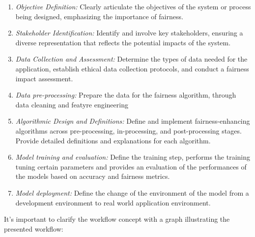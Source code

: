 \documentclass[12pt,a4paper,openright,twoside]{book}
\begin{document}
\begin{enumerate}

    \item \emph{Objective Definition:} Clearly articulate the objectives of the system or process being designed, emphasizing the importance of fairness.

    \item \emph{Stakeholder Identification:} Identify and involve key stakeholders, ensuring a diverse representation that reflects the potential impacts of the system.

    \item \emph{Data Collection and Assessment:} Determine the types of data needed for the application, establish ethical data collection protocols, and conduct a fairness impact assessment.

    \item \emph{Data pre-processing:} Prepare the data for the fairness algorithm, through data cleaning and featyre engineering
    
    \item \emph{Algorithmic Design and Definitions:} Define and implement fairness-enhancing algorithms across pre-processing, in-processing, and post-processing stages. Provide detailed definitions and explanations for each algorithm.

    \item \emph{Model training and evaluation:} Define the training step, performs the training tuning certain parameters and provides an evaluation of the performances of the models based on accuracy and fairness metrics.

    \item \emph{Model deployment:} Define the change of the environment of the model from a development environment to real world application environment.

\end{enumerate}

It's important to clarify the workflow concept with a graph illustrating the presented workflow:
\end{document}
